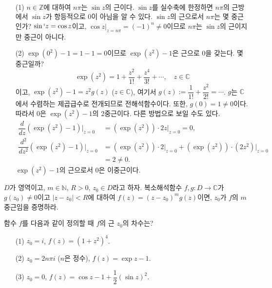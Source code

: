 \begin{salt_example} \label{example-4-6}
\
\begin{itemize}
\item[(1)] $n\in \mathbb Z$에 대하여 $n\pi$는 $\sin z$의 근이다.
$\sin z$를 실수축에 한정하면 $n\pi$의 근방에서 
$\sin z$가 항등적으로 $0$이 아님을 알 수 있다.
$\sin z$의 근으로서 $n\pi$는 몇 중근인가?
$\sin `z = \cos z$이고, $\cos z \Big|_{z=n\pi}= (-1)^n \ne 0$이므로
$n\pi$는 $\sin z$의 근이지만 중근이 아니다.
\item[(2)] $\exp(0^2) -1 = 1-1 = 0$이므로
$\exp (z^2) -1$은 근으로 $0$을 갖는다.
몇 중근일까?
\[
\exp (z^2) = 1 + \dfrac{z^2}{1!} + \dfrac{z^4}{3!} + \cdots,
\quad z\in \mathbb C
\]
이고, $\exp(z^2) -1 = z^2g(z)$ ($z\in \mathbb C$),
여기서 $g(z):= \dfrac1{1!} + \dfrac{z^2}{2!} = \cdots$.
$g$는 $\mathbb C$에서 수렴하는  제곱급수로 전개되므로
전해석함수이다. 또한, $g(0)=1\ne 0$이다.
따라서 $0$은 $\exp(z^2) -1$의 2중근이다.
다른 방법으로 보일 수도 있다.
\begin{align*}
\dfrac{d}{dz} (\exp(z^2)-1) \Big|_{z=0} 
&= (\exp(z^2))\cdot 2z  \Big|_{z=0}  = 0, \\
\dfrac{d^2}{dz^2} (\exp(z^2)-1)\Big|_{z=0} 
&=  (\exp(z^2))\cdot 2 \Big|_{z=0}  +  (\exp(z^2))\cdot (2z^2)  \Big|_{z=0}  \\
&= 2\ne 0.
\end{align*}
$\exp(z^2) -1$의 근으로서 $0$은 이중근이다.
\end{itemize}
\end{salt_example}

\begin{salt_exercise} \label{ex-4-17}
$D$가 영역이고, $m\in \mathbb N$, $R>0$, $z_0\in D$라고 하자.
복소해석함수 $f,g: D\to \mathbb C$가 $g(z_0)\ne0$이고
$|z-z_0|<R$에 대하여 $f(z) = (z-z_0)^m g(z)$이면,
$z_0$가 $f$의 $m$ 중근임을 증명하라.
\end{salt_exercise}

\begin{salt_exercise} \label{ex-4-18}
함수 $f$를 다음과 같이 정의할 때 $f$의 근 $z_0$의 차수는?
\begin{itemize}
\item[(1)]  $z_0 = i$, $f(z) = (1+z^2)^4$.
\item[(2)]  $z_0 = 2n\pi i$ ($n$은 정수), $f(z) = \exp z -1$.
\item[(3)] $z_0=0$, $f(z) = \cos z - 1 + \dfrac12(\sin z)^2$.
\end{itemize}
\end{salt_exercise}

